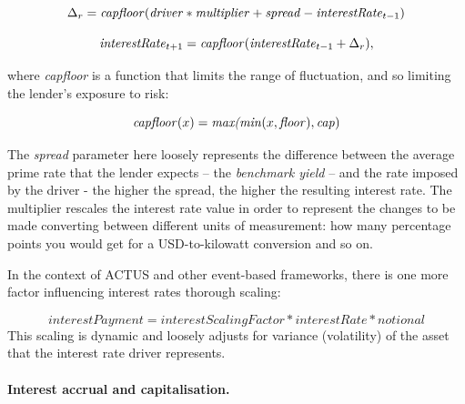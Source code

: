 \documentclass[runningheads]{llncs}
\newcommand{\ident}[1]{\mbox{\emph{#1}}}
\begin{document}

\noindent 
\begin{equation}
\Delta_{r}=\ident{capfloor}(\ident{driver}*\ident{multiplier}+\ident{spread}-\ident{interestRate}_{t-1})
\end{equation}

\noindent 
\begin{equation}
\ident{interestRate}_{t+1}=\ident{capfloor}(\ident{interestRate}_{t-1}+\Delta_{r}),
\end{equation}

\noindent
where \emph{capfloor} is a function that limits the range of fluctuation,  
and so limiting the lender's exposure to risk:

\noindent 
\begin{equation}
\ident{capfloor}(x)=\ident{max(min}(x,\ident{floor}),\ident{cap})
\end{equation}

\noindent
The \emph{spread} parameter here loosely represents the difference between
the average prime 
rate that the lender expects -- the \emph{benchmark yield} -- and
the rate imposed by the driver - the higher the spread, the higher
the resulting interest rate. The multiplier %
rescales the interest rate value 
in order to represent the changes to be made converting between different units
of measurement: how many percentage points 
you would get for a USD-to-kilowatt conversion
and so on.

In the context of ACTUS and other event-based frameworks, 
there is
one more factor influencing interest rates thorough scaling:

\noindent 
\begin{equation}
interestPayment=interestScalingFactor*interestRate*notional
\end{equation}
\noindent
This scaling is dynamic and loosely adjusts for variance (volatility)
of the asset that the interest rate driver represents.

\paragraph*{Interest accrual and capitalisation. }
\end{document}
